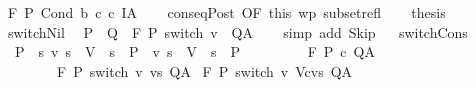 \begin{isabellebody}
\ {\isachardoublequoteopen}{\isasymGamma}{\isacharcomma}{\isasymTheta}{\isasymturnstile}\isactrlbsub {\isacharslash}F\isactrlesub \ P\ {\isacharparenleft}Cond\ b\ c\ c\ I{\isacharcomma}A{\isachardoublequoteclose}\isacommand{{\isachardot}}\isamarkupfalse%
\isanewline
\ \ \isamarkupfalse%
\ conseqPost\ {\isacharbrackleft}OF\ this\ wp{\isacharprime}\ subset{\isacharunderscore}refl{\isacharbrackright}\isanewline
\ \ \isamarkupfalse%
\ {\isacharquery}thesis\ \isacommand{{\isachardot}}\isamarkupfalse%
\isanewline
{}\isamarkupfalse%
%
\endisatagproof
{\isafoldproof}%
%
\isadelimproof
\isanewline
%
\endisadelimproof
\ \ \ \ \isanewline
\isanewline
{}\isamarkupfalse%
\ switchNil{\isacharcolon}\isanewline
\ \ {\isachardoublequoteopen}P\ {\isasymsubseteq}\ Q\ {\isasymLongrightarrow}\ {\isasymGamma}{\isacharcomma}{\isasymTheta}{\isasymturnstile}\isactrlbsub {\isacharslash}F\ \isactrlesub P\ {\isacharparenleft}switch\ v\ {\isacharbrackleft}{\isacharbrackright}{\isacharparenright}\ Q{\isacharcomma}A{\isachardoublequoteclose}\isanewline
%
\isadelimproof
\ \ %
\endisadelimproof
%
\isatagproof
{}\isamarkupfalse%
\ {\isacharparenleft}simp\ add{\isacharcolon}\ Skip{\isacharparenright}%
\endisatagproof
{\isafoldproof}%
%
\isadelimproof
\isanewline
%
\endisadelimproof
\ \isanewline
{}\isamarkupfalse%
\ switchCons{\isacharcolon}\isanewline
\ \ {\isachardoublequoteopen}{\isasymlbrakk}P\ {\isasymsubseteq}\ {\isacharbraceleft}s{\isachardot}\ {\isacharparenleft}v\ s\ {\isasymin}\ V\ {\isasymlongrightarrow}\ s\ {\isasymin}\ P\ {\isasymand}\ {\isacharparenleft}v\ s\ {\isasymnotin}\ V\ {\isasymlongrightarrow}\ s\ {\isasymin}\ P\ \isanewline
\ \ \ \ \ \ \ \ {\isasymGamma}{\isacharcomma}{\isasymTheta}{\isasymturnstile}\isactrlbsub {\isacharslash}F\ \isactrlesub P\ c\ Q{\isacharcomma}A{\isacharsemicolon}\isanewline
\ \ \ \ \ \ \ \ {\isasymGamma}{\isacharcomma}{\isasymTheta}{\isasymturnstile}\isactrlbsub {\isacharslash}F\ \isactrlesub P\ {\isacharparenleft}switch\ v\ vs{\isacharparenright}\ Q{\isacharcomma}A{\isasymrbrakk}\isanewline
{\isasymLongrightarrow}\ {\isasymGamma}{\isacharcomma}{\isasymTheta}{\isasymturnstile}\isactrlbsub {\isacharslash}F\ \isactrlesub P\ {\isacharparenleft}switch\ v\ {\isacharparenleft}{\isacharparenleft}V{\isacharcomma}c{\isacharparenright}{\isacharhash}vs{\isacharparenright}{\isacharparenright}\ Q{\isacharcomma}A{\isachardoublequoteclose}\isanewline

\end{isabellebody}
